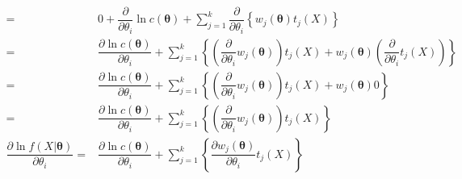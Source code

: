 \documentclass[
]{book}
\theoremstyle{definition}
\theoremstyle{definition}
\theoremstyle{definition}
\theoremstyle{definition}
\theoremstyle{remark}
\begin{document}
\[\begin{aligned}
= & 0+\dfrac{\partial}{\partial\theta_{{\scriptscriptstyle i}}}\ln c\left(\boldsymbol{\theta}\right)+\sum\limits _{j=1}^{k}\dfrac{\partial}{\partial\theta_{{\scriptscriptstyle i}}}\left\{ w_{{\scriptscriptstyle j}}\left(\boldsymbol{\theta}\right)t_{{\scriptscriptstyle j}}\left(X\right)\right\} \\
= & \dfrac{\partial\ln c\left(\boldsymbol{\theta}\right)}{\partial\theta_{{\scriptscriptstyle i}}}+\sum\limits _{j=1}^{k}\left\{ \left(\dfrac{\partial}{\partial\theta_{{\scriptscriptstyle i}}}w_{{\scriptscriptstyle j}}\left(\boldsymbol{\theta}\right)\right)t_{{\scriptscriptstyle j}}\left(X\right)+w_{{\scriptscriptstyle j}}\left(\boldsymbol{\theta}\right)\left(\dfrac{\partial}{\partial\theta_{{\scriptscriptstyle i}}}t_{{\scriptscriptstyle j}}\left(X\right)\right)\right\} \\
= & \dfrac{\partial\ln c\left(\boldsymbol{\theta}\right)}{\partial\theta_{{\scriptscriptstyle i}}}+\sum\limits _{j=1}^{k}\left\{ \left(\dfrac{\partial}{\partial\theta_{{\scriptscriptstyle i}}}w_{{\scriptscriptstyle j}}\left(\boldsymbol{\theta}\right)\right)t_{{\scriptscriptstyle j}}\left(X\right)+w_{{\scriptscriptstyle j}}\left(\boldsymbol{\theta}\right)0\right\} \\
= & \dfrac{\partial\ln c\left(\boldsymbol{\theta}\right)}{\partial\theta_{{\scriptscriptstyle i}}}+\sum\limits _{j=1}^{k}\left\{ \left(\dfrac{\partial}{\partial\theta_{{\scriptscriptstyle i}}}w_{{\scriptscriptstyle j}}\left(\boldsymbol{\theta}\right)\right)t_{{\scriptscriptstyle j}}\left(X\right)\right\} \\
\dfrac{\partial\ln f\left(X|\boldsymbol{\theta}\right)}{\partial\theta_{{\scriptscriptstyle i}}}= & \dfrac{\partial\ln c\left(\boldsymbol{\theta}\right)}{\partial\theta_{{\scriptscriptstyle i}}}+\sum\limits _{j=1}^{k}\left\{ \dfrac{\partial w_{{\scriptscriptstyle j}}\left(\boldsymbol{\theta}\right)}{\partial\theta_{{\scriptscriptstyle i}}}t_{{\scriptscriptstyle j}}\left(X\right)\right\} \\
\end{aligned}
\]
\end{document}
